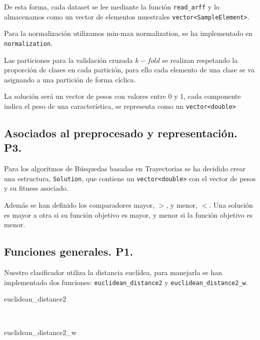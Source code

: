 \documentclass[11pt,a4paper]{article}
\theoremstyle{definition}
\begin{document}
	De esta forma, cada dataset se lee mediante la función \texttt{read\_arff} y lo almacenamos como un vector de elementos muestrales \texttt{vector<SampleElement>}. 
	
	Para la normalización utilizamos min-max normalization, se ha implementado en \texttt{normalization}.
	
	Las particiones para la validación cruzada $k-fold$ se realizan respetando la proporción de clases en cada partición, para ello cada elemento de una clase se va asignando a una partición de forma cíclica.
	
	La solución será un vector de pesos con valores entre 0 y 1, cada componente indica el peso de una característica, se representa como un \texttt{vector<double>}
	\subsection{Asociados al preprocesado y representación. P3.}
	Para los algoritmos de Búsquedas basadas en Trayectorias se ha decidido crear una estructura, \texttt{Solution}, que contiene un \texttt{vector<double>} con el vector de pesos y su fitness asociado. 
	
	Además se han definido los comparadores mayor, $>$, y menor, $<$. Una solución es mayor a otra si su función objetivo es mayor, y menor si la función objetivo es menor.
	
	\subsection{Funciones generales. P1.}
	Nuestro clasificador utiliza la distancia euclídea, para manejarla se han implementado dos funciones: \texttt{euclidean\_distance2} y \texttt{euclidean\_distance2\_w}.\\
	
	
	\begin{algorithm}[H]
		\caption{euclidean\_distance2}
	\end{algorithm}~\\
	
	\begin{algorithm}[H]
		\caption{euclidean\_distance2\_w}
	\end{algorithm}~\\
	
\end{document}
